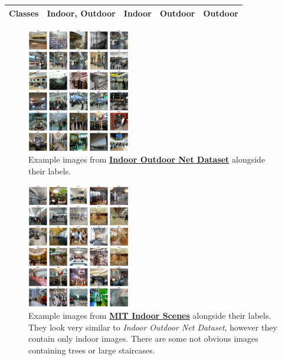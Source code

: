 \documentclass[a4paper]{article}
\begin{document}
\begin{table}[H]
\begin{tabular}{@{}lllll@{}}
        Classes         & Indoor, Outdoor                                                                                                & Indoor                                                                                              & Outdoor                                                                                          & Outdoor                                                            \\
        \bottomrule
    \end{tabular}
\end{table}

\begin{figure}[H]
    \centering
    \includegraphics[width=0.4\textwidth]{images/indoor-outdoor-20k.png}
    \caption{Example images from \href{https://huggingface.co/datasets/prithivMLmods/IndoorOutdoorNet-20K}{\textbf{Indoor Outdoor Net Dataset}} alongside their labels.}
\end{figure}

\begin{figure}[H]
    \centering
    \includegraphics[width=0.4\textwidth]{images/mit-indoor-scenes.png}
    \caption{Example images from \href{https://www.kaggle.com/datasets/itsahmad/indoor-scenes-cvpr-2019}{\textbf{MIT Indoor Scenes}} alongside their labels. They look very similar to \textit{Indoor Outdoor Net Dataset}, however they contain only indoor images. There are some not obvious images containing trees or large staircases.}
\end{figure}
\end{document}
